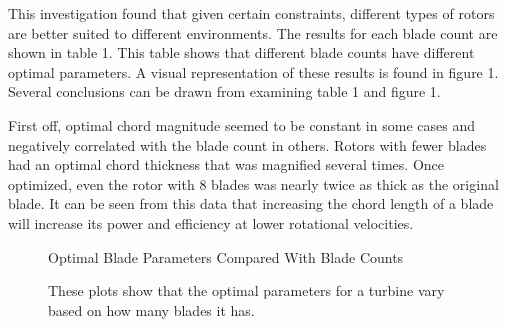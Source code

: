 \documentclass{article}
\begin{document}
This investigation found that given certain constraints, different types of rotors are better suited to different environments. The results for each blade count are shown in table 1. This table shows that different blade counts have different optimal parameters. A visual representation of these results is found in figure 1. Several conclusions can be drawn from examining table 1 and figure 1. \newline

First off, optimal chord magnitude seemed to be constant in some cases and negatively correlated with the blade count in others. Rotors with fewer blades had an optimal chord thickness that was magnified several times.  Once optimized, even the rotor with 8 blades was nearly twice as thick as the original blade. It can be seen from this data that increasing the chord length of a blade will increase its power and efficiency at lower rotational velocities. \newline

\begin{figure}
  \centering

  \hspace{1em}
  \caption{Optimal Blade Parameters Compared With Blade Counts}
  \captionsetup{aboveskip=0pt,font=it}
  \caption*{These plots show that the optimal parameters for a turbine vary based on how many blades it has.}
  \label{fig:2}
\end{figure}
\end{document}
